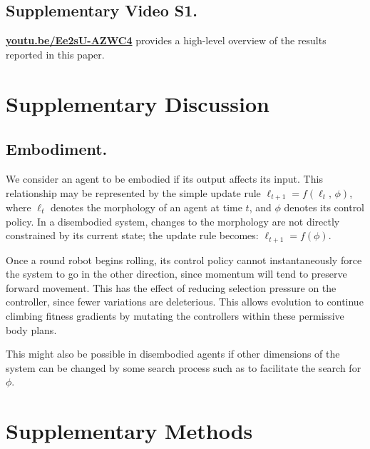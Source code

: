 
\subsection*{Supplementary Video S1.}
\label{video}
\href{https://youtu.be/Ee2sU-AZWC4}{\color{blue}\textbf{youtu.be/Ee2sU-AZWC4}}
provides a high-level overview of the results reported in this paper.





\section{Supplementary Discussion}
\label{sec4:supplementary-discussion}



\subsection*{Embodiment.}

We consider an agent to be embodied if its output affects its input.
This relationship may be represented by the simple update rule $\ell_{t+1} = f(\ell_t,\, \phi)$,
where $\ell_t$ denotes the morphology of an agent at time $t$, and $\phi$ denotes its control policy.
In a disembodied system, changes to the morphology are not directly constrained by its current state; the update rule becomes: $\ell_{t+1} = f(\phi)$.

Once a round robot begins rolling, its control policy cannot instantaneously force the system to go in the other direction, since
momentum will tend to preserve forward movement.
This has the effect of reducing selection pressure on the controller, since fewer variations are deleterious.
This allows evolution to continue climbing fitness gradients by mutating the controllers within these permissive body plans.

This might also be possible in disembodied agents if other dimensions of the system can be changed by some search process such as to facilitate the search for $\phi$.



\section{Supplementary Methods}
\label{sec4:supplementary-methods}

